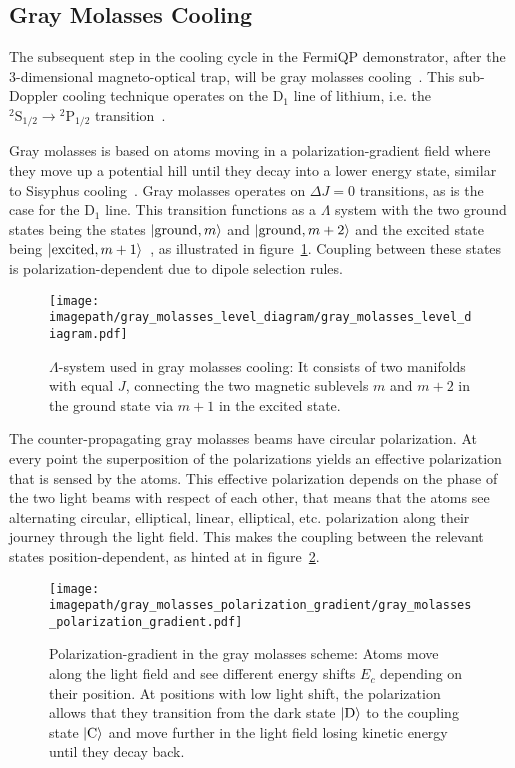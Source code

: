 \subsection*{Gray Molasses Cooling}
The subsequent step in the cooling cycle in the FermiQP demonstrator, after the 3-dimensional magneto-optical trap, will be gray molasses cooling~\cite{grynberg_proposal_1994,weidemuller_novel_1994}. This sub-Doppler cooling technique operates on the D$_1$ line of lithium, i.e. the $^2\text{S}_{1/2} \rightarrow {^2\text{P}_{1/2}}$ transition~\cite{burchianti_efficient_2014}.

Gray molasses is based on atoms moving in a polarization-gradient field where they move up a potential hill until they decay into a lower energy state, similar to Sisyphus cooling~\cite{foot_atomic_2005}. Gray molasses operates on $\Delta J = 0$ transitions, as is the case for the D$_1$ line. This transition functions as a $\Lambda$ system with the two ground states being the states $\Ket{\text{ground}, m}$ and $\Ket{\text{ground}, m + 2}$ and the excited state being $\Ket{\text{excited}, m + 1}$~\cite{weidemuller_novel_1994}, as illustrated in figure~\ref{fig:gray_molasses_level_diagram}. Coupling between these states is polarization-dependent due to dipole selection rules.
\begin{figure}
    \centering
    \texttt{[image: \\imagepath/gray\_molasses\_level\_diagram/gray\_molasses\_level\_diagram.pdf]}
    \caption{$\Lambda$-system used in gray molasses cooling: It consists of two manifolds with equal $J$, connecting the two magnetic sublevels $m$ and $m+2$ in the ground state via $m+1$ in the excited state.}
    \label{fig:gray_molasses_level_diagram}
\end{figure}

The counter-propagating gray molasses beams have circular polarization. At every point the superposition of the polarizations yields an effective polarization that is sensed by the atoms. This effective polarization depends on the phase of the two light beams with respect of each other, that means that the atoms see alternating circular, elliptical, linear, elliptical, etc. polarization along their journey through the light field. This makes the coupling between the relevant states position-dependent, as hinted at in figure~\ref{fig:gray_molasses_polarization_gradient}.

\begin{figure}
    \centering
    \texttt{[image: \\imagepath/gray\_molasses\_polarization\_gradient/gray\_molasses\_polarization\_gradient.pdf]}
    \caption{Polarization-gradient in the gray molasses scheme: Atoms move along the light field and see different energy shifts $E_c$ depending on their position. At positions with low light shift, the polarization allows that they transition from the dark state $\Ket{\text{D}}$ to the coupling state $\Ket{\text{C}}$ and move further in the light field losing kinetic energy until they decay back.}\label{fig:gray_molasses_polarization_gradient}
\end{figure}

